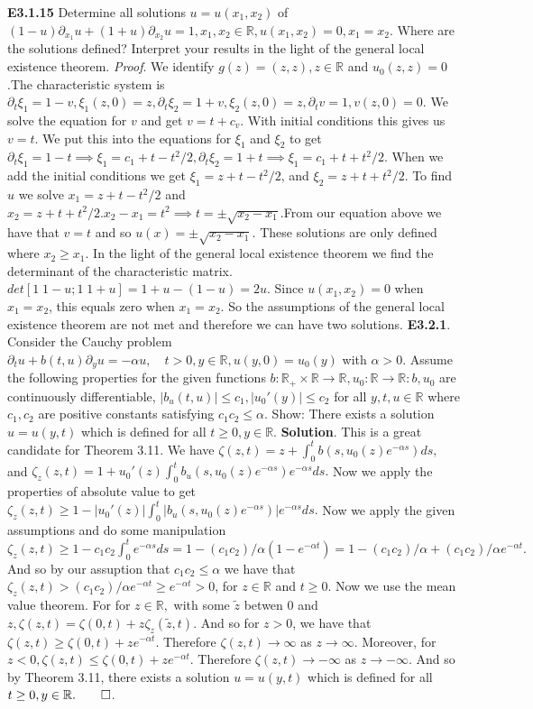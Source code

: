 \documentclass[6pt]{article}
\newcommand{\R}{\mathbb{R}}
\newcommand{\ra}{\rightarrow}
\begin{document}
\begin{multicols}{2}
{\bf E3.1.15} Determine all solutions $u=u(x_1,x_2)$ of $(1-u)\partial_{x_1} u+(1+u)\partial_{x_2} u=1,  x_1, x_2 \in \R, u(x_1, x_2)=0,  x_1=x_2$. Where are the solutions defined?  Interpret your results in the light of the general local existence theorem. {\it Proof}. We identify $g(z)=(z,z), z \in \R$ and $u_0(z,z)=0$.The characteristic system is $\partial_t \xi_1 =1-v, \xi_1(z,0)=z, \partial_t \xi_2 =1+v, \xi_2(z,0)=z, \partial_t v =1, v(z,0)=0$. We solve the equation for $v$ and get $v=t+c_v$.  With initial conditions this gives us $v=t$. We put this into the equations for $\xi_1$ and $\xi_2$ to get $\partial_t \xi_1=1-t \implies \xi_1=c_1+t-t^2/2, \partial_t \xi_2=1+t \implies \xi_1=c_1+t+t^2/2$. When we add the initial conditions we get $\xi_1 = z+t-t^2/2$, and $\xi_2=z+t+t^2/2$. To find $u$ we solve $x_1= z+t-t^2/2$ and $x_2=z+t+t^2/2. x_2-x_1 = t^2 \implies t=\pm \sqrt{x_2-x_1}$.From our equation above we have that $v=t$ and so $u(x)=\pm \sqrt{x_2-x_1}$.  These solutions are only defined where $x_2 \geq x_1$.  In the light of the general local existence theorem we find the determinant of the characteristic matrix. $det[1\; 1-u; 1 \; 1+u ] =1+u-(1-u)=2u$. Since $u(x_1, x_2)=0$ when $x_1=x_2$, this equals zero when  $x_1=x_2$.  So the assumptions of the general local existence theorem are not met and therefore we can have two solutions. 
{\bf E3.2.1}. Consider the Cauchy problem $\partial_t u +  b(t,u)\partial_y u = -\alpha u, \quad t > 0, y \in \R, u(y,0)=u_0(y)$ with $\alpha > 0$. Assume the following properties for the given functions $b: \R_+ \times \R \ra \R, u_0: \R \ra \R: b, u_0$ are continuously differentiable, $|b_u(t,u)| \leq c_1, |u_0'(y)| \leq c_2$ for all $y, t, u \in \R$ where $c_1, c_2$ are positive constants satisfying $c_1c_2 \leq \alpha$.  Show:  There exists a solution $u = u(y,t)$ which is defined for all $t \geq 0, y \in \R$. {\bf Solution}. This is a great candidate for Theorem 3.11.  We have $\zeta(z,t)=z + \int_0^t b(s,u_0(z)e^{-\alpha s})ds,$ and $\zeta_z(z,t)=1+u_0'(z) \int_0^t b_u(s,u_0(z)e^{-\alpha s})e^{-\alpha s}ds.$ Now we apply the properties of absolute value to get $\zeta_z(z,t)\geq 1-|u_0'(z)| \int_0^t |b_u(s,u_0(z)e^{-\alpha s})|e^{-\alpha s}ds.$ Now we apply the given assumptions and do some manipulation $\zeta_z(z,t)\geq 1-c_1 c_2 \int_0^t e^{-\alpha s}ds=1- (c_1 c_2)/\alpha (1- e^{-\alpha t})=1- (c_1 c_2)/\alpha + (c_1 c_2)/\alpha  e^{-\alpha t}.$ And so by our assuption that $c_1 c_2 \leq \alpha$ we have that $\zeta_z(z,t)>(c_1 c_2)/\alpha e^{-\alpha t}\geq e^{-\alpha t} >0$, for $z \in \R$ and $t \geq 0.$ Now we use the mean value theorem.  For for $z \in \R,$ with some $\tilde{z}$ betwen 0 and $z,\zeta(z,t)=\zeta(0,t)+z \zeta_z(\tilde{z},t).$ And so for $z > 0$, we have that $\zeta(z,t) \geq \zeta(0,t)+z   e^{-\alpha t}.$ Therefore $\zeta(z,t) \ra \infty$ as $z \ra \infty$. Moreover, for $z < 0, \zeta(z,t) \leq \zeta(0,t)+z  e^{-\alpha t}.$ Therefore $\zeta(z,t) \ra -\infty$ as $z \ra -\infty$. And so by Theorem 3.11, there exists a solution $u = u(y,t)$ which is defined for all $t \geq 0, y \in \R. \qed$.

\end{multicols}
\end{document}
